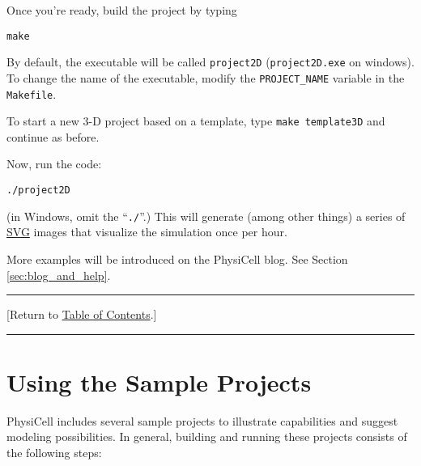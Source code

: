 \documentclass[12pt]{article}
\renewcommand{\v}{\verb}
\newcommand{\TOClink}{\begin{center}\hrule\vskip-5pt\phantom{.}\hfill[Return to \hyperlink{TOC}{Table of Contents}.]\hfill\phantom{.}\vskip3pt\hrule\end{center}}
\begin{document}
Once you're ready, build the project by typing 

\v|make|

By default, the executable will be called \v|project2D| (\v|project2D.exe| on windows). To 
change the name of the executable, modify the \v|PROJECT_NAME| variable in the \v|Makefile|. 

To start a new 3-D project based on a template, type \v|make template3D| and continue as before. 

Now, run the code: 

\v|./project2D|

(in Windows, omit the ``\v|./|''.) This will generate (among other things) a series of \href{https://en.wikipedia.org/wiki/Scalable_Vector_Graphics}{SVG} images  
that visualize the simulation once per hour. 

More examples will be introduced on the PhysiCell blog. See 
Section \ref{sec:blog_and_help}.

\TOClink

\section{Using the Sample Projects}
\label{sec:sample_projects}
PhysiCell includes several sample projects to illustrate capabilities and 
suggest modeling possibilities. In general, building and running these projects 
consists of the following steps:
\end{document}
